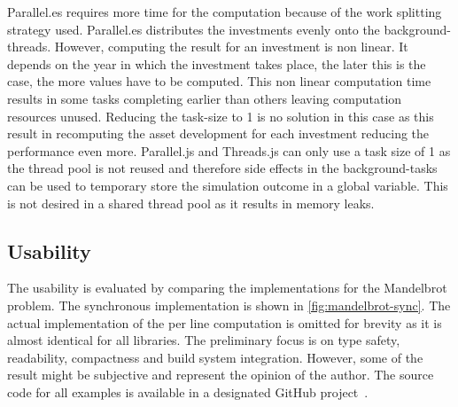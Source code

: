 Parallel.es requires more time for the computation because of the work splitting strategy used. Parallel.es distributes the investments evenly onto the background-threads. However, computing the result for an investment is non linear. It depends on the year in which the investment takes place, the later this is the case, the more values have to be computed. This non linear computation time results in some tasks completing earlier than others leaving computation resources unused. Reducing the task-size to 1 is no solution in this case as this result in recomputing the asset development for each investment reducing the performance even more. Parallel.js and Threads.js can only use a task size of 1 as the thread pool is not reused and therefore side effects in the background-tasks can be used to temporary store the simulation outcome in a global variable. This is not desired in a shared thread pool as it results in memory leaks.


\subsection{Usability}
The usability is evaluated by comparing the implementations for the Mandelbrot problem. The synchronous implementation is shown in \cref{fig:mandelbrot-sync}. The actual implementation of the per line computation is omitted for brevity as it is almost identical for all libraries. The preliminary focus is on type safety, readability, compactness and build system integration. However, some of the result might be subjective and represent the opinion of the author. The source code for all examples is available in a designated GitHub project~\cite{Reiser2016}. 

